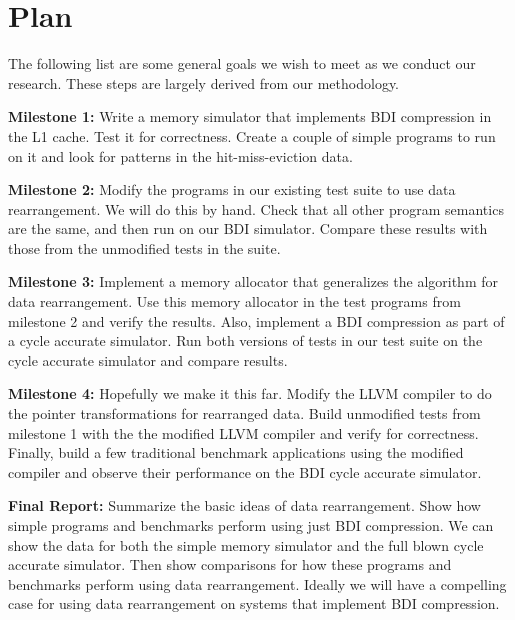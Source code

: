\documentclass[pageno]{jpaper}
\begin{document}
\section{Plan}
The following list are some general goals we wish to meet as we conduct our research. These steps are largely derived from our methodology.
				
\textbf{Milestone 1:} Write a memory simulator that implements BDI compression in the L1 cache. Test it for correctness. Create a couple of simple programs to run on it and look for patterns in the hit-miss-eviction data.
					
\textbf{Milestone 2:} Modify the programs in our existing test suite to use data rearrangement. We will do this by hand. Check that all other program semantics are the same, and then run on our BDI simulator. Compare these results with those from the unmodified tests in the suite.
					
\textbf{Milestone 3:} Implement a memory allocator that generalizes the algorithm for data rearrangement. Use this memory allocator in the test programs from milestone 2 and verify the results. Also, implement a BDI compression as part of a cycle accurate simulator. Run both versions of tests in our test suite on the cycle accurate simulator and compare results.

\textbf{Milestone 4:} Hopefully we make it this far. Modify the LLVM compiler to do the pointer transformations for rearranged data. Build unmodified tests from milestone 1 with the the modified LLVM compiler and verify for correctness. Finally, build a few traditional benchmark applications using the modified compiler and observe their performance on the BDI cycle accurate simulator.

\textbf{Final Report:} Summarize the basic ideas of data rearrangement. Show how simple programs and benchmarks perform using just BDI compression. We can show the data for both the simple memory simulator and the full blown cycle accurate simulator. Then show comparisons for how these programs and  benchmarks perform using data rearrangement. Ideally we will have a compelling case for using data rearrangement on systems that implement BDI compression.
\end{document}
